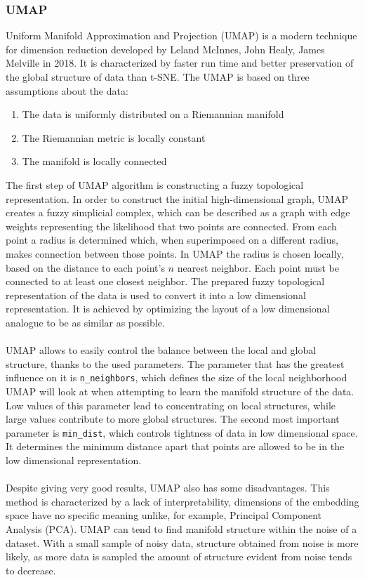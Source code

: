 \documentclass[12pt]{article}
\begin{document}
\subsubsection{UMAP}

Uniform Manifold Approximation and Projection (UMAP) is a modern technique for dimension reduction developed by Leland McInnes, John Healy, James Melville in 2018\cite{McInnesHealyMelville2018}. It is characterized by faster run time and better preservation of the global structure of data than t-SNE. The UMAP is based on three assumptions about the data:
\begin{enumerate}
    \item The data is uniformly distributed on a Riemannian manifold
    \item The Riemannian metric is locally constant
    \item The manifold is locally connected
\end{enumerate}
The first step of UMAP algorithm is constructing a fuzzy topological representation. In order to construct the initial high-dimensional graph, UMAP creates a fuzzy simplicial complex, which can be described as a graph with edge weights representing the likelihood that two points are connected. From each point a radius is determined which, when superimposed on a different radius, makes connection between those points. In UMAP the radius is chosen locally, based on the distance to each point's $n$ nearest neighbor. Each point must be connected to at least one closest neighbor. The prepared fuzzy topological representation of the data is used to convert it into a low dimensional representation. It is achieved by optimizing the layout of a low dimensional analogue to be as similar as possible\cite{CoenenPearce2019}. 
\\
\\
UMAP allows to easily control the balance between the local and global structure, thanks to the used parameters. The parameter that has the greatest influence on it is \verb|n_neighbors|, which defines the size of the local neighborhood UMAP will look at when attempting to learn the manifold structure of the data. Low values of this parameter lead to concentrating on local structures, while large values contribute to more global structures. The second most important parameter is \verb|min_dist|, which controls tightness of data in low dimensional space. It determines the minimum distance apart that points are allowed to be in the low dimensional representation\cite{McInnes2018}. 
\\
\\
Despite giving very good results, UMAP also has some disadvantages. This method is characterized by a lack of interpretability, dimensions of the embedding space have no specific meaning unlike, for example, Principal Component Analysis (PCA). UMAP can tend to find manifold structure within the noise of a dataset. With a small sample of noisy data, structure obtained from noise is more likely, as more data is sampled the amount of structure evident from noise tends to decrease\cite{McInnesHealyMelville2018}. 
\end{document}
